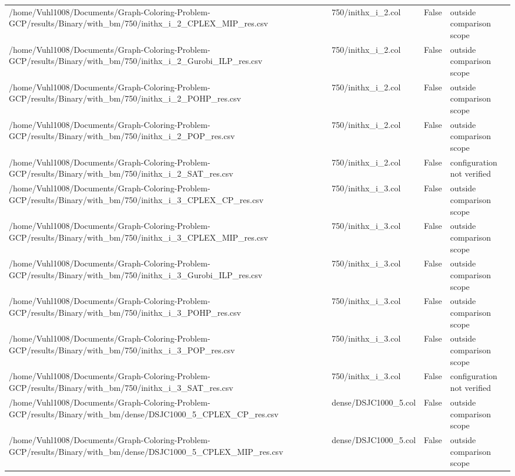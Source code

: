 \begin{table}[htbp]
\begin{tabular}{llll}
/home/Vuhl1008/Documents/Graph-Coloring-Problem-GCP/results/Binary/with\_bm/750/inithx\_i\_2\_CPLEX\_MIP\_res.csv & 750/inithx\_i\_2.col & False & outside comparison scope \\
/home/Vuhl1008/Documents/Graph-Coloring-Problem-GCP/results/Binary/with\_bm/750/inithx\_i\_2\_Gurobi\_ILP\_res.csv & 750/inithx\_i\_2.col & False & outside comparison scope \\
/home/Vuhl1008/Documents/Graph-Coloring-Problem-GCP/results/Binary/with\_bm/750/inithx\_i\_2\_POHP\_res.csv & 750/inithx\_i\_2.col & False & outside comparison scope \\
/home/Vuhl1008/Documents/Graph-Coloring-Problem-GCP/results/Binary/with\_bm/750/inithx\_i\_2\_POP\_res.csv & 750/inithx\_i\_2.col & False & outside comparison scope \\
/home/Vuhl1008/Documents/Graph-Coloring-Problem-GCP/results/Binary/with\_bm/750/inithx\_i\_2\_SAT\_res.csv & 750/inithx\_i\_2.col & False & configuration not verified \\
/home/Vuhl1008/Documents/Graph-Coloring-Problem-GCP/results/Binary/with\_bm/750/inithx\_i\_3\_CPLEX\_CP\_res.csv & 750/inithx\_i\_3.col & False & outside comparison scope \\
/home/Vuhl1008/Documents/Graph-Coloring-Problem-GCP/results/Binary/with\_bm/750/inithx\_i\_3\_CPLEX\_MIP\_res.csv & 750/inithx\_i\_3.col & False & outside comparison scope \\
/home/Vuhl1008/Documents/Graph-Coloring-Problem-GCP/results/Binary/with\_bm/750/inithx\_i\_3\_Gurobi\_ILP\_res.csv & 750/inithx\_i\_3.col & False & outside comparison scope \\
/home/Vuhl1008/Documents/Graph-Coloring-Problem-GCP/results/Binary/with\_bm/750/inithx\_i\_3\_POHP\_res.csv & 750/inithx\_i\_3.col & False & outside comparison scope \\
/home/Vuhl1008/Documents/Graph-Coloring-Problem-GCP/results/Binary/with\_bm/750/inithx\_i\_3\_POP\_res.csv & 750/inithx\_i\_3.col & False & outside comparison scope \\
/home/Vuhl1008/Documents/Graph-Coloring-Problem-GCP/results/Binary/with\_bm/750/inithx\_i\_3\_SAT\_res.csv & 750/inithx\_i\_3.col & False & configuration not verified \\
/home/Vuhl1008/Documents/Graph-Coloring-Problem-GCP/results/Binary/with\_bm/dense/DSJC1000\_5\_CPLEX\_CP\_res.csv & dense/DSJC1000\_5.col & False & outside comparison scope \\
/home/Vuhl1008/Documents/Graph-Coloring-Problem-GCP/results/Binary/with\_bm/dense/DSJC1000\_5\_CPLEX\_MIP\_res.csv & dense/DSJC1000\_5.col & False & outside comparison scope \\

\end{tabular}
\end{table}
